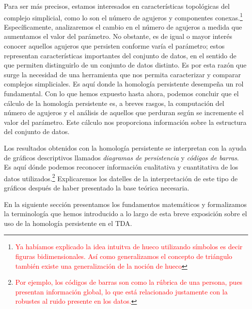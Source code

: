 \documentclass[a4paper,11pt]{article}
\newcommand{\red}[1]{\textcolor{red}{#1}}
\begin{document}
Para ser más precisos, estamos interesados en características topológicas del complejo simplicial, como lo son  el número de agujeros y componentes conexas.\footnote{\red{Ya  habíamos explicado la idea intuitva de hueco utilizando símbolos es decir figuras bidimensionales. Así como generalizamos el concepto de triángulo también existe una generalización de la noción de hueco}}
Específicamente,
analizaremos  el cambio en el  número de agujeros a medida que aumentamos el valor del parámetro.
No obstante, es de igual o mayor interés conocer aquellos agujeros que persisten conforme varía el parámetro; estos representan características importantes del conjunto de datos, en el sentido de que permiten distinguirlo de un conjunto de datos distinto. Es por esta razón que surge la necesidad de una herramienta que nos permita caracterizar y comparar complejos  simpliciales.
Es aquí donde  la homología persistente desempeña un rol fundamental.
Con lo que hemos expuesto hasta ahora, podemos concluir que  el cálculo de la homología persistente es, a breves rasgos, la computación del número de agujeros y el análisis de aquellos que perduran según se incremente  el valor del parámetro. Este cálculo nos proporciona información sobre la estructura del conjunto de datos.


Los resultados obtenidos con la homología persistente se  interpretan con la ayuda de gráficos descriptivos llamados \textit{diagramas de persistencia} y \textit{códigos de barras}.
Es aquí dónde podemos reconocer información cualitativa y cuantitativa de los datos utilizados.\footnote{\red{Por ejemplo, los códigos de barras son como la rúbrica de una persona, pues presentan información global, lo que está relacionado justamente con la robustes al ruido presente en los datos.}}
Explicaremos los datelles de la interpretación de este tipo de gráficos  después de haber presentado la base teórica necesaria.


En la siguiente sección presentamos los fundamentos matemáticos y formalizamos la terminología que hemos introducido a lo largo de esta breve exposición sobre el uso de  la homología persistente en el TDA.
\end{document}
